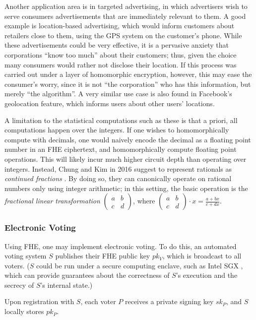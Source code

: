 Another application area is in targeted advertising, in which advertisers wish to serve consumers advertisements that are immediately relevant to them. A good example is location-based advertising, which would inform customers about retailers close to them, using the GPS system on the customer's phone. While these advertisements could be very effective, it is a pervasive anxiety that corporations ``know too much'' about their customers; thus, given the choice many consumers would rather not disclose their location. If this process was carried out under a layer of homomorphic encryption, however, this may ease the consumer's worry, since it is not ``the corporation'' who has this information, but merely ``the algorithm''. A very similar use case is also found in Facebook's geolocation feature, which informs users about other users' locations.

A limitation to the statistical computations such as these is that a priori, all computations happen over the integers. If one wishes to homomorphically compute with decimals, one would naively encode the decimal as a floating point number in an FHE ciphertext, and homomorphically compute floating point operations. This will likely incur much higher circuit depth than operating over integers. Instead, Chung and Kim in 2016 suggest to represent rationals as \emph{continued fractions} \cite{rational}. By doing so, they can canonically operate on rational numbers only using integer arithmetic; in this setting, the basic operation is the \emph{fractional linear transformation} $\begin{pmatrix} a & b \\ c & d \end{pmatrix}$, where $\begin{pmatrix} a & b \\ c & d \end{pmatrix} \cdot x = \frac{a + bx}{c + dx}$.

\subsubsection{Electronic Voting}
Using FHE, one may implement electronic voting. To do this, an automated voting system $S$ publishes their FHE public key $pk_V$, which is broadcast to all voters. ($S$ could be run under a secure computing enclave, such as Intel SGX \cite{sgx}, which can provide guarantees about the correctness of $S$'s execution and the secrecy of $S$'s internal state.)

 Upon registration with $S$, each voter $P$ receives a private signing key $sk_P$, and $S$ locally stores $pk_P$.

